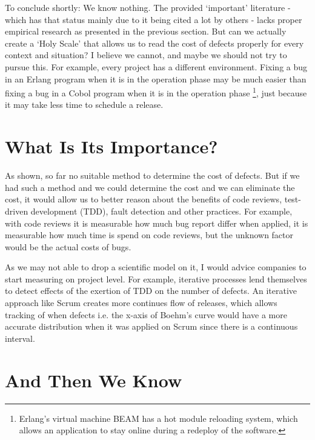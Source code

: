 To conclude shortly: We know nothing.
The provided `important' literature - which has that status mainly due to it being cited a lot by others - lacks proper empirical research as presented in the previous section.
But can we actually create a `Holy Scale' that allows us to read the cost of defects properly for every context and situation?
I believe we cannot, and maybe we should not try to pursue this.
For example, every project has a different environment.
Fixing a bug in an Erlang program when it is in the operation phase may be much easier than fixing a bug in a Cobol program when it is in the operation phase
\footnote{Erlang's virtual machine BEAM has a hot module reloading system, which allows an application to stay online during a redeploy of the software.},
just because it may take less time to schedule a release.

\section*{What Is Its Importance?}

As shown, so far no suitable method to determine the cost of defects.
But if we had such a method and we could determine the cost and we can eliminate the cost,
it would allow us to better reason about the benefits of code reviews, test-driven development (TDD), fault detection and other practices.
For example, with code reviews it is measurable how much bug report differ when applied, it is measurable how much time is spend on code reviews, but the unknown factor would be the actual costs of bugs.

As we may not able to drop a scientific model on it, I would advice companies to start measuring on project level. For example, iterative processes lend themselves to detect effects of the exertion of TDD on the number of defects.
An iterative approach like Scrum creates more continues flow of releases, which allows tracking of when defects i.e. the x-axis of Boehm's curve would have a more accurate distribution when it was applied on Scrum since there is a continuous interval.

\section*{And Then We Know}

